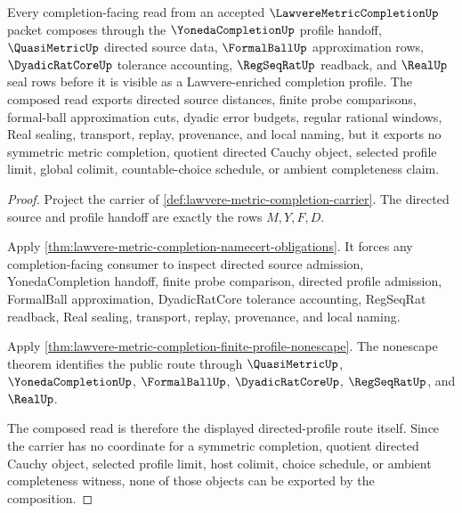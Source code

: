 \begin{theorem}
\label{thm:lawvere-metric-completion-directed-profile-composition}
Every completion-facing read from an accepted $\LawvereMetricCompletionUp$ packet composes through the $\YonedaCompletionUp$ profile handoff, $\QuasiMetricUp$ directed source data, $\FormalBallUp$ approximation rows, $\DyadicRatCoreUp$ tolerance accounting, $\RegSeqRatUp$ readback, and $\RealUp$ seal rows before it is visible as a Lawvere-enriched completion profile. The composed read exports directed source distances, finite probe comparisons, formal-ball approximation cuts, dyadic error budgets, regular rational windows, Real sealing, transport, replay, provenance, and local naming, but it exports no symmetric metric completion, quotient directed Cauchy object, selected profile limit, global colimit, countable-choice schedule, or ambient completeness claim.
\end{theorem}
\begin{proof}
Project the carrier of \autoref{def:lawvere-metric-completion-carrier}. The directed source and profile handoff are exactly the rows $M,Y,F,D$.

Apply \autoref{thm:lawvere-metric-completion-namecert-obligations}. It forces any completion-facing consumer to inspect directed source admission, YonedaCompletion handoff, finite probe comparison, directed profile admission, FormalBall approximation, DyadicRatCore tolerance accounting, RegSeqRat readback, Real sealing, transport, replay, provenance, and local naming.

Apply \autoref{thm:lawvere-metric-completion-finite-profile-nonescape}. The nonescape theorem identifies the public route through $\QuasiMetricUp$, $\YonedaCompletionUp$, $\FormalBallUp$, $\DyadicRatCoreUp$, $\RegSeqRatUp$, and $\RealUp$.

The composed read is therefore the displayed directed-profile route itself. Since the carrier has no coordinate for a symmetric completion, quotient directed Cauchy object, selected profile limit, host colimit, choice schedule, or ambient completeness witness, none of those objects can be exported by the composition.
\end{proof}


